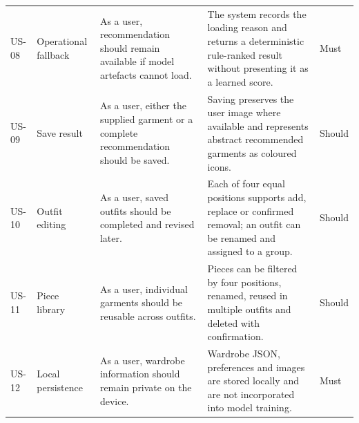 \begin{longtable}{@{}p{}p{}p{}p{}p{}@{}}
  US-08 & Operational fallback & As a user, recommendation should remain available if model artefacts cannot load. & The system records the loading reason and returns a deterministic rule-ranked result without presenting it as a learned score. & Must \\
  US-09 & Save result & As a user, either the supplied garment or a complete recommendation should be saved. & Saving preserves the user image where available and represents abstract recommended garments as coloured icons. & Should \\
  US-10 & Outfit editing & As a user, saved outfits should be completed and revised later. & Each of four equal positions supports add, replace or confirmed removal; an outfit can be renamed and assigned to a group. & Should \\
  US-11 & Piece library & As a user, individual garments should be reusable across outfits. & Pieces can be filtered by four positions, renamed, reused in multiple outfits and deleted with confirmation. & Should \\
  US-12 & Local persistence & As a user, wardrobe information should remain private on the device. & Wardrobe JSON, preferences and images are stored locally and are not incorporated into model training. & Must \\
\end{longtable}
\endgroup
